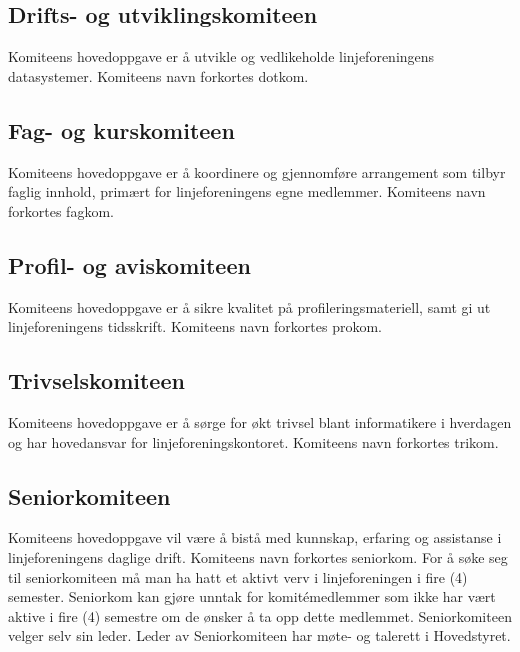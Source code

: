 \vspace{-10pt}
\subsection{Drifts- og utviklingskomiteen}{
Komiteens hovedoppgave er å utvikle og vedlikeholde linjeforeningens datasystemer. Komiteens navn forkortes dotkom.

}

\vspace{-10pt}
\subsection{Fag- og kurskomiteen}{
Komiteens hovedoppgave er å koordinere og gjennomføre arrangement som tilbyr faglig innhold, primært for linjeforeningens egne medlemmer. Komiteens navn forkortes fagkom.
}

\vspace{-10pt}
\subsection{Profil- og aviskomiteen}{
Komiteens hovedoppgave er å sikre kvalitet på profileringsmateriell, samt gi ut linjeforeningens tidsskrift. Komiteens navn forkortes prokom.
}

\vspace{-10pt}
\subsection{Trivselskomiteen}{
Komiteens hovedoppgave er å sørge for økt trivsel blant informatikere i hverdagen og har hovedansvar for linjeforeningskontoret. Komiteens navn forkortes trikom.
}

\vspace{-10pt}
\subsection{Seniorkomiteen}{
Komiteens hovedoppgave vil være å bistå med kunnskap, erfaring og assistanse i linjeforeningens daglige drift. Komiteens navn forkortes seniorkom. For å søke seg til seniorkomiteen må man ha hatt et aktivt verv i linjeforeningen i fire (4) semester. Seniorkom kan gjøre unntak for komitémedlemmer som ikke har vært aktive i fire (4) semestre om de ønsker å ta opp dette medlemmet.	Seniorkomiteen velger selv sin leder. Leder av Seniorkomiteen har møte- og talerett i Hovedstyret.
}

